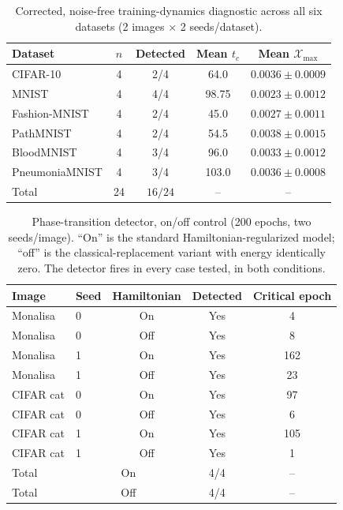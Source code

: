 \documentclass[11pt]{article}
\begin{document}
\begin{table}[H]
\centering
\caption{Corrected, noise-free training-dynamics diagnostic across all six datasets (2 images $\times$ 2 seeds/dataset).}
\label{tab:phase_transition_corrected}
\scriptsize
\begin{tabular}{lcccc}
\toprule
Dataset & $n$ & Detected & Mean $t_c$ & Mean $\mathcal{X}_{\max}$ \\
\midrule
CIFAR-10 & 4 & 2/4 & 64.0 & $0.0036\pm0.0009$ \\
MNIST & 4 & 4/4 & 98.75 & $0.0023\pm0.0012$ \\
Fashion-MNIST & 4 & 2/4 & 45.0 & $0.0027\pm0.0011$ \\
PathMNIST & 4 & 2/4 & 54.5 & $0.0038\pm0.0015$ \\
BloodMNIST & 4 & 3/4 & 96.0 & $0.0033\pm0.0012$ \\
PneumoniaMNIST & 4 & 3/4 & 103.0 & $0.0036\pm0.0008$ \\
\midrule
Total & 24 & $16/24$ & -- & -- \\
\bottomrule
\end{tabular}
\end{table}

\begin{table}[H]
\centering
\caption{Phase-transition detector, on/off control (200 epochs, two seeds/image). ``On'' is the standard Hamiltonian-regularized model; ``off'' is the classical-replacement variant with energy identically zero. The detector fires in every case tested, in both conditions.}
\label{tab:phase_transition_onoff}
\scriptsize
\begin{tabular}{llccc}
\toprule
Image & Seed & Hamiltonian & Detected & Critical epoch \\
\midrule
Monalisa & 0 & On & Yes & 4 \\
Monalisa & 0 & Off & Yes & 8 \\
Monalisa & 1 & On & Yes & 162 \\
Monalisa & 1 & Off & Yes & 23 \\
CIFAR cat & 0 & On & Yes & 97 \\
CIFAR cat & 0 & Off & Yes & 6 \\
CIFAR cat & 1 & On & Yes & 105 \\
CIFAR cat & 1 & Off & Yes & 1 \\
\midrule
Total & \multicolumn{2}{c}{On} & 4/4 & -- \\
Total & \multicolumn{2}{c}{Off} & 4/4 & -- \\
\bottomrule
\end{tabular}
\end{table}
\end{document}
